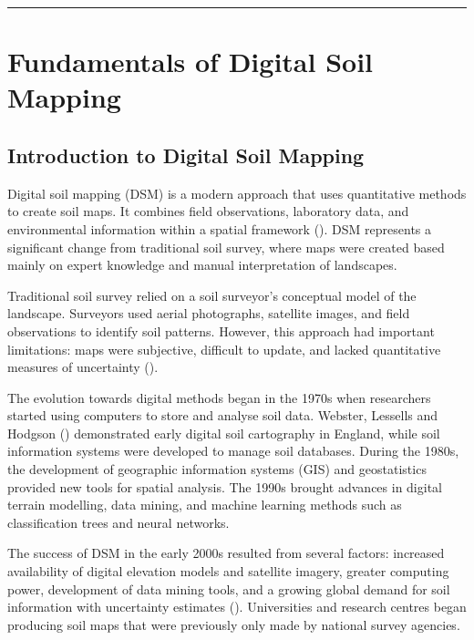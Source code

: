 \documentclass[
  10pt,
  b5paper,
  oneside]{book}
\begin{document}
\begin{center}\rule{0.5\linewidth}{0.5pt}\end{center}

\section{Fundamentals of Digital Soil Mapping}\label{fundamentals-of-digital-soil-mapping}

\subsection{Introduction to Digital Soil Mapping}\label{introduction-to-digital-soil-mapping}

Digital soil mapping (DSM) is a modern approach that uses quantitative methods to create soil maps. It combines field observations, laboratory data, and environmental information within a spatial framework (). DSM represents a significant change from traditional soil survey, where maps were created based mainly on expert knowledge and manual interpretation of landscapes.

Traditional soil survey relied on a soil surveyor's conceptual model of the landscape. Surveyors used aerial photographs, satellite images, and field observations to identify soil patterns. However, this approach had important limitations: maps were subjective, difficult to update, and lacked quantitative measures of uncertainty ().

The evolution towards digital methods began in the 1970s when researchers started using computers to store and analyse soil data. Webster, Lessells and Hodgson () demonstrated early digital soil cartography in England, while soil information systems were developed to manage soil databases. During the 1980s, the development of geographic information systems (GIS) and geostatistics provided new tools for spatial analysis. The 1990s brought advances in digital terrain modelling, data mining, and machine learning methods such as classification trees and neural networks.

The success of DSM in the early 2000s resulted from several factors: increased availability of digital elevation models and satellite imagery, greater computing power, development of data mining tools, and a growing global demand for soil information with uncertainty estimates (). Universities and research centres began producing soil maps that were previously only made by national survey agencies.
\end{document}
